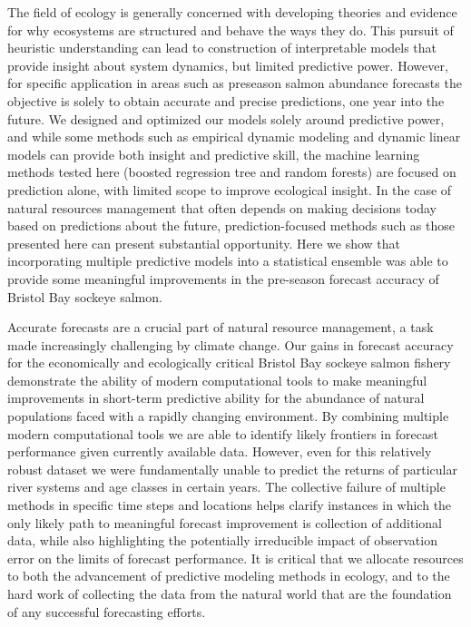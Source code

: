 \documentclass[
]{article}
\begin{document}
The field of ecology is generally concerned with developing theories and evidence for why ecosystems are structured and behave the ways they do. This pursuit of heuristic understanding can lead to construction of interpretable models that provide insight about system dynamics, but limited predictive power. However, for specific application in areas such as preseason salmon abundance forecasts the objective is solely to obtain accurate and precise predictions, one year into the future. We designed and optimized our models solely around predictive power, and while some methods such as empirical dynamic modeling and dynamic linear models can provide both insight and predictive skill, the machine learning methods tested here (boosted regression tree and random forests) are focused on prediction alone, with limited scope to improve ecological insight. In the case of natural resources management that often depends on making decisions today based on predictions about the future, prediction-focused methods such as those presented here can present substantial opportunity. Here we show that incorporating multiple predictive models into a statistical ensemble was able to provide some meaningful improvements in the pre-season forecast accuracy of Bristol Bay sockeye salmon.

Accurate forecasts are a crucial part of natural resource management, a task made increasingly challenging by climate change. Our gains in forecast accuracy for the economically and ecologically critical Bristol Bay sockeye salmon fishery demonstrate the ability of modern computational tools to make meaningful improvements in short-term predictive ability for the abundance of natural populations faced with a rapidly changing environment. By combining multiple modern computational tools we are able to identify likely frontiers in forecast performance given currently available data. However, even for this relatively robust dataset we were fundamentally unable to predict the returns of particular river systems and age classes in certain years. The collective failure of multiple methods in specific time steps and locations helps clarify instances in which the only likely path to meaningful forecast improvement is collection of additional data, while also highlighting the potentially irreducible impact of observation error on the limits of forecast performance. It is critical that we allocate resources to both the advancement of predictive modeling methods in ecology, and to the hard work of collecting the data from the natural world that are the foundation of any successful forecasting efforts.
\end{document}
